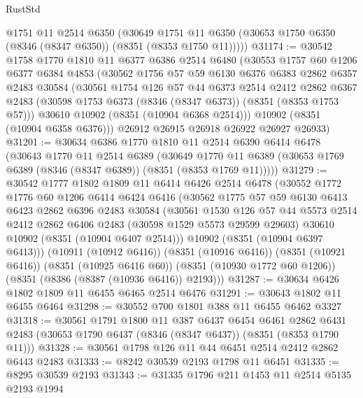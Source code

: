 \begin{lexlean}{RustStd}
\begin{coremodule}
      @1751
      @11
      @2514
      @6350
      (@30649 @1751 @11 @6350 (@30653 @1750 @6350 (@8346 (@8347 @6350)) (@8351 (@8353 @1750 @11)))))
@31174 := @30542
    @1758
    @1770
    @1810
    @11
    @6377
    @6386
    @2514
    @6480
    (@30553
      @1757
      @60
      @1206
      @6377
      @6384
      @4853
      (@30562
        @1756
        @57
        @59
        @6130
        @6376
        @6383
        @2862
        @6357
        @2483
        @30584
        (@30561
          @1754
          @126
          @57
          @44
          @6373
          @2514
          @2412
          @2862
          @6367
          @2483
          (@30598 @1753 @6373 (@8346 (@8347 @6373)) (@8351 (@8353 @1753 @57)))
          @30610
          @10902
          (@8351 (@10904 @6368 @2514)))
        @10902
        (@8351 (@10904 @6358 @6376)))
      @26912
      @26915
      @26918
      @26922
      @26927
      @26933)
@31201 := @30634
    @6386
    @1770
    @1810
    @11
    @2514
    @6390
    @6414
    @6478
    (@30643
      @1770
      @11
      @2514
      @6389
      (@30649 @1770 @11 @6389 (@30653 @1769 @6389 (@8346 (@8347 @6389)) (@8351 (@8353 @1769 @11)))))
@31279 := @30542
    @1777
    @1802
    @1809
    @11
    @6414
    @6426
    @2514
    @6478
    (@30552
      @1772
      @1776
      @60
      @1206
      @6414
      @6424
      @6416
      (@30562
        @1775
        @57
        @59
        @6130
        @6413
        @6423
        @2862
        @6396
        @2483
        @30584
        (@30561
          @1530
          @126
          @57
          @44
          @5573
          @2514
          @2412
          @2862
          @6406
          @2483
          (@30598 @1529 @5573 @29599 @29603)
          @30610
          @10902
          (@8351 (@10904 @6407 @2514)))
        @10902
        (@8351 (@10904 @6397 @6413)))
      (@10911 (@10912 @6416))
      (@8351 (@10916 @6416))
      (@8351 (@10921 @6416))
      (@8351 (@10925 @6416 @60))
      (@8351 (@10930 @1772 @60 @1206))
      (@8351 (@8386 (@8387 (@10936 @6416)) @2193)))
@31287 := @30634 @6426 @1802 @1809 @11 @6455 @6465 @2514 @6476
@31291 := @30643 @1802 @11 @6455 @6464
@31298 := @30552 @700 @1801 @388 @11 @6455 @6462 @3327
@31318 := @30561
    @1791
    @1800
    @11
    @387
    @6437
    @6454
    @6461
    @2862
    @6431
    @2483
    (@30653 @1790 @6437 (@8346 (@8347 @6437)) (@8351 (@8353 @1790 @11)))
@31328 := @30561 @1798 @126 @11 @44 @6451 @2514 @2412 @2862 @6443 @2483
@31333 := @8242 @30539 @2193 @1798 @11 @6451
@31335 := @8295 @30539 @2193
@31343 := @31335 @1796 @211 @1453 @11 @2514 @5135 @2193 @1994

\end{coremodule}
\end{lexlean}
